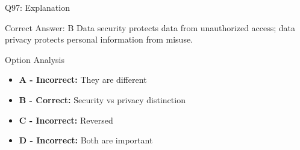 \documentclass{beamer}
\begin{document}
	\begin{frame}{Q97: Explanation}
		\begin{block}{Correct Answer: B}
			Data security protects data from unauthorized access; data privacy protects personal information from misuse.
		\end{block}
		\begin{block}{Option Analysis}
			\begin{itemize}
				\item \textbf{A - Incorrect:} They are different
				\item \textbf{B - Correct:} Security vs privacy distinction
				\item \textbf{C - Incorrect:} Reversed
				\item \textbf{D - Incorrect:} Both are important
			\end{itemize}
		\end{block}
	\end{frame}
	
\end{document}
